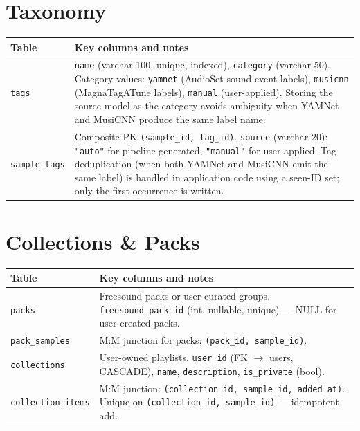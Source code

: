 \documentclass[12pt,letterpaper]{report}
\begin{document}
\section{Taxonomy}

\begin{center}
\begin{tabularx}{\textwidth}{lX}
\toprule
\textbf{Table} & \textbf{Key columns and notes} \\
\midrule
\texttt{tags}
  & \texttt{name} (varchar 100, unique, indexed), \texttt{category}
    (varchar 50). Category values: \texttt{yamnet} (AudioSet sound-event
    labels), \texttt{musicnn} (MagnaTagATune labels), \texttt{manual}
    (user-applied). Storing the source model as the category avoids
    ambiguity when YAMNet and MusiCNN produce the same label name. \\
\addlinespace
\texttt{sample\_tags}
  & Composite PK \texttt{(sample\_id, tag\_id)}.
    \texttt{source} (varchar 20): \texttt{"auto"} for pipeline-generated,
    \texttt{"manual"} for user-applied. Tag deduplication (when both YAMNet
    and MusiCNN emit the same label) is handled in application code using a
    seen-ID set; only the first occurrence is written. \\
\bottomrule
\end{tabularx}
\end{center}

\section{Collections \& Packs}

\begin{center}
\begin{tabularx}{\textwidth}{lX}
\toprule
\textbf{Table} & \textbf{Key columns and notes} \\
\midrule
\texttt{packs}
  & Freesound packs or user-curated groups.
    \texttt{freesound\_pack\_id} (int, nullable, unique) --- NULL for
    user-created packs. \\
\texttt{pack\_samples}
  & M:M junction for packs: \texttt{(pack\_id, sample\_id)}. \\
\addlinespace
\texttt{collections}
  & User-owned playlists.
    \texttt{user\_id} (FK $\to$ users, CASCADE), \texttt{name},
    \texttt{description}, \texttt{is\_private} (bool). \\
\texttt{collection\_items}
  & M:M junction: \texttt{(collection\_id, sample\_id, added\_at)}.
    Unique on \texttt{(collection\_id, sample\_id)} --- idempotent add. \\
\bottomrule
\end{tabularx}
\end{center}
\end{document}
